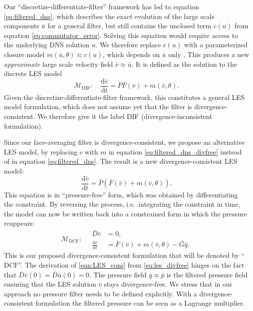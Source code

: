 \documentclass[preprint]{elsarticle}
\begin{document}
Our ``discretize-differentiate-filter'' framework has led to equation
\eqref{eq:filtered_dns}, which describes the exact evolution of the large scale
components $\bar{u}$ for a general filter, but still contains the unclosed term
$c(u)$ from equation \eqref{eq:commutator_error}. 
Solving this equation would require access to the underlying DNS solution $u$.
We therefore replace $c(u)$ with a parameterized closure model
$m(\bar{u}, \theta) \approx c(u)$, which depends on $\bar{u}$ only
\cite{Pope2000,Sagaut2005,Berselli2006}. This produces a new \emph{approximate}
large scale velocity field $\bar{v} \approx \bar{u}$. It is defined as the
solution to the
discrete LES model
\begin{equation} \label{eq:les}
    \mathcal{M}_{\text{DIF}}: \quad
    \boxed{
    \frac{\mathrm{d} \bar{v}}{\mathrm{d} t} =
        \bar{P} \bar{F}(\bar{v}) + m(\bar{v}, \theta)
    }.
\end{equation}
Given the discretize-differentiate-filter framework, this constitutes a general LES
model formulation, which does not assume yet that the filter is
divergence-consistent. We therefore give it the label DIF (divergence-inconsistent formulation).

Since our face-averaging filter is divergence-consistent, we propose an
alternative LES model, by replacing $c$ with $m$ in equation
\eqref{eq:filtered_dns_divfree} instead of in equation \eqref{eq:filtered_dns}.
The result is a new divergence-consistent LES model: 
\begin{equation} \label{eq:les_divfree}
    \frac{\mathrm{d} \bar{v}}{\mathrm{d} t} =
        \bar{P} \left( \bar{F}(\bar{v}) + m(\bar{v}, \theta) \right).
\end{equation}
This equation is in ``pressure-free'' form, which was obtained by differentiating
the constraint. By reversing the process, i.e.\ integrating the constraint in
time, the model can now be written back into a constrained form in which the
pressure reappears:
\begin{equation} \label{eqn:LES_cons}
    \mathcal{M}_{\text{DCF}}: \quad
    \boxed{
        \begin{aligned}
        \bar{D} \bar{v} & = 0,\\
        \frac{\mathrm{d} \bar{v}}{\mathrm{d} t} & =  \bar{F}(\bar{v}) +
        m(\bar{v}, \theta)  - \bar{G} \bar{q}.
        \end{aligned}
    }
\end{equation}
This is our proposed divergence-consistent formulation that will be denoted by
``$\text{DCF}$''. The derivation of \eqref{eqn:LES_cons} from \eqref{eq:les_divfree}
hinges on the fact that $\bar{D} \bar{v}(0) = \bar{D} \bar{u}(0) = 0$. The
pressure field $\bar{q} \approx \bar{p}$ is the filtered pressure field ensuring
that the LES solution $\bar{v}$ stays divergence-free. We stress that in our
approach no pressure filter needs to be defined explicitly. With a
divergence-consistent formulation the filtered pressure can be seen as a
Lagrange multiplier.
\end{document}
